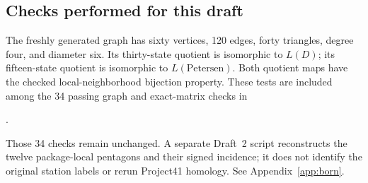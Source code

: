 \subsection{Checks performed for this draft}
The freshly generated graph has sixty vertices, 120 edges, forty triangles, degree four, and diameter six. Its thirty-state quotient is isomorphic to $L(D)$; its fifteen-state quotient is isomorphic to $L(\mathrm{Petersen})$. Both quotient maps have the checked local-neighborhood bijection property. These tests are included among the 34 passing graph and exact-matrix checks in
\begin{center}
.
\end{center}
Those 34 checks remain unchanged. A separate Draft~2 script reconstructs the twelve package-local pentagons and their signed incidence; it does not identify the original station labels or rerun Project41 homology. See Appendix~\ref{app:born}.
